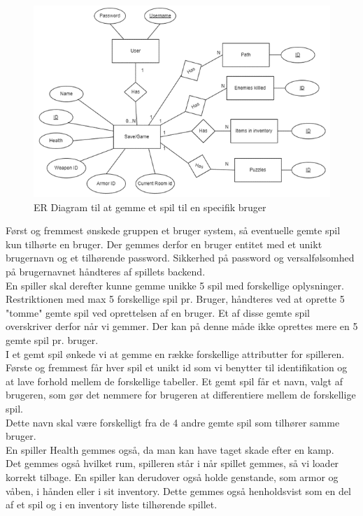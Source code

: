 \begin{figure}[H]
\centering
\includegraphics[width = \textwidth]{02-Body/Images/ER-GameSave.PNG}
\caption{ER Diagram til at gemme et spil til en specifik bruger}
\label{fig:ER-GameSave}
\end{figure}

Først og fremmest ønskede gruppen et bruger system, så eventuelle gemte spil kun tilhørte en bruger.
Der gemmes derfor en bruger entitet med et unikt brugernavn og et tilhørende password.
Sikkerhed på password og versalfølsomhed på brugernavnet håndteres af spillets backend.\\
En spiller skal derefter kunne gemme unikke 5 spil med forskellige oplysninger.
Restriktionen med max 5 forskellige spil pr. Bruger, håndteres ved at oprette 5 "tomme" gemte spil ved oprettelsen af en bruger.
Et af disse gemte spil overskriver derfor når vi gemmer. Der kan på denne måde ikke oprettes mere en 5 gemte spil pr. bruger.\\
I et gemt spil ønkede vi at gemme en række forskellige attributter for spilleren.
Første og fremmest får hver spil et unikt id som vi benytter til identifikation og at lave forhold mellem de forskellige tabeller.
Et gemt spil får et navn, valgt af brugeren, som gør det nemmere for brugeren at differentiere mellem de forskellige spil. \\ Dette navn skal være forskelligt fra de 4 andre gemte spil som tilhører samme bruger.\\
En spiller Health gemmes også, da man kan have taget skade efter en kamp.\\
Det gemmes også hvilket rum, spilleren står i når spillet gemmes, så vi loader korrekt tilbage. 
En spiller kan derudover også holde genstande, som armor og våben, i hånden eller i sit inventory. Dette gemmes også henholdsvist som en del af et spil og i en inventory liste tilhørende spillet. 

